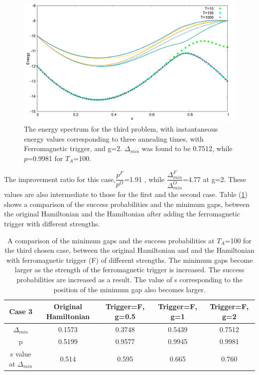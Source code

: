 \documentclass[../main.tex]{subfiles}
\begin{document}
\begin{figure}[H]
\centering 
\includegraphics[scale=0.3]{528_s12_F_g2.png}
\caption{The energy spectrum for the third problem, with instantaneous energy values corresponding to three annealing times, with Ferromagnetic trigger, and g=2. $\Delta_{min}$ was found to be 0.7512, while $p$=0.9981 for $T_A$=100.}
\label{fig:f9}
\end{figure}
The improvement ratio for this case,$\dfrac{p^F}{p^O}$=1.91 , while $\dfrac{\Delta_{min}^F}{\Delta_{min}^O}$=4.77 at g=2. These values are also intermediate to those for the first and the second case.  Table (\ref{tab:f3}) shows a comparison of the success probabilities and the minimum gaps, between the original Hamiltonian and the Hamiltonian after adding the ferromagnetic trigger with different strengths.
\begin{table}
\centering
\renewcommand{\arraystretch}{1.8}
\begin{tabular}{|c|c|c|c|c|}
\hline 
Case 3 & Original Hamiltonian & Trigger=F, g=0.5 & Trigger=F, g=1 & Trigger=F, g=2 \\ 
\hline 
$\Delta_{min}$ & 0.1573 & 0.3748 & 0.5439 & 0.7512 \\ 
\hline 
p & 0.5199 & 0.9577 & 0.9945 & 0.9981 \\ 
\hline 
s value at $\Delta_{min}$ & 0.514 & 0.595 & 0.665 & 0.760 \\
\hline

\end{tabular} 
\caption{A comparison of the minimum gaps and the success probabilities at $T_A$=100 for the third chosen case, between the original Hamiltonian and and the Hamiltonian with ferromagnetic trigger (F) of different strengths. The minimum gaps become larger as the strength of the ferromagnetic trigger is increased. The success probabilities are increased as a result. The value of s corresponding to the position of the minimum gap also becomes larger.}
\label{tab:f3}
\end{table}
\\
\end{document}
